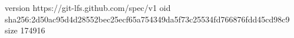 version https://git-lfs.github.com/spec/v1
oid sha256:2d50ac95d4d28552bec25ecf65a754349da5f73c25534fd766876fdd45cd98c9
size 174916
